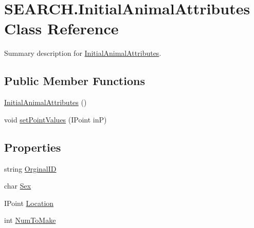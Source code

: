 \hypertarget{class_s_e_a_r_c_h_1_1_initial_animal_attributes}{\section{S\-E\-A\-R\-C\-H.\-Initial\-Animal\-Attributes Class Reference}
\label{class_s_e_a_r_c_h_1_1_initial_animal_attributes}
}


Summary description for \hyperlink{class_s_e_a_r_c_h_1_1_initial_animal_attributes}{Initial\-Animal\-Attributes}.  


\subsection*{Public Member Functions}
\begin{DoxyCompactItemize}
\item 
\hyperlink{class_s_e_a_r_c_h_1_1_initial_animal_attributes_a525bf4ba782d522d1bea36d53e59a004}{Initial\-Animal\-Attributes} ()
\item 
void \hyperlink{class_s_e_a_r_c_h_1_1_initial_animal_attributes_abd1c34d82c605d328dc45d12ae9189c9}{set\-Point\-Values} (I\-Point in\-P)
\end{DoxyCompactItemize}
\subsection*{Properties}
\begin{DoxyCompactItemize}
\item 
string \hyperlink{class_s_e_a_r_c_h_1_1_initial_animal_attributes_a657b581df7f956dd0d71f859896bb75e}{Orginal\-I\-D}
\item 
char \hyperlink{class_s_e_a_r_c_h_1_1_initial_animal_attributes_aacb87a569062245a6f75e83ff1eee1d1}{Sex}
\item 
I\-Point \hyperlink{class_s_e_a_r_c_h_1_1_initial_animal_attributes_a855323a46a243ea936451da3d04fa0a7}{Location}
\item 
int \hyperlink{class_s_e_a_r_c_h_1_1_initial_animal_attributes_ab5edf1fff77568b74fe69b83a283dcf2}{Num\-To\-Make}
\end{DoxyCompactItemize}



